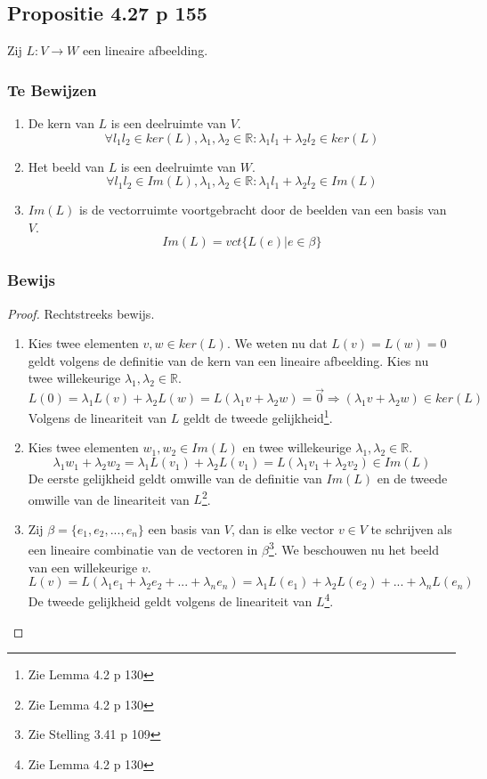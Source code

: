 \documentclass[lineaire_algebra_oplossingen.tex]{subfiles}
\begin{document}
\subsection{Propositie 4.27 p 155}
Zij $L: V\rightarrow W$ een lineaire afbeelding.
\subsubsection*{Te Bewijzen}
\begin{enumerate}
\item De kern van $L$ is een deelruimte van $V$.
\[
\forall l_1l_2\in ker(L), \lambda_1,\lambda_2\in \mathbb{R}: \lambda_1l_1+\lambda_2l_2 \in ker(L)
\]
\item Het beeld van $L$ is een deelruimte van $W$.
\[
\forall l_1l_2\in Im(L), \lambda_1,\lambda_2\in \mathbb{R}: \lambda_1l_1+\lambda_2l_2 \in Im(L)
\]
\item $Im(L)$ is de vectorruimte voortgebracht door de beelden van een basis van $V$.
\[
Im(L) = vct\{L(e)|e\in \beta\}
\]
\end{enumerate}
\subsubsection*{Bewijs}
\begin{proof}
Rechtstreeks bewijs.
\begin{enumerate}
\item Kies twee elementen $v,w \in ker(L)$. We weten nu dat $L(v)=L(w)=0$ geldt volgens de definitie van de kern van een lineaire afbeelding. Kies nu twee willekeurige $\lambda_1,\lambda_2 \in \mathbb{R}$.
\[
 L(0) = \lambda_1L(v)+\lambda_2L(w) = L(\lambda_1v+\lambda_2w) = \vec{0}
 \Rightarrow  (\lambda_1v+\lambda_2w) \in ker(L)
\]
Volgens de lineariteit van $L$ geldt de tweede gelijkheid\footnote{Zie Lemma 4.2 p 130}.
\item Kies twee elementen $w_1,w_2 \in Im(L)$ en twee willekeurige $\lambda_1,\lambda_2 \in \mathbb{R}$.
\[
\lambda_1w_1+\lambda_2w_2 = \lambda_1L(v_1) + \lambda_2L(v_1) = L(\lambda_1v_1+\lambda_2v_2) \in Im(L)
\]
De eerste gelijkheid geldt omwille van de definitie van $Im(L)$ en de tweede omwille van de lineariteit van $L$\footnote{Zie Lemma 4.2 p 130}.
\item Zij $\beta = \{e_1,e_2,...,e_n\}$ een basis van $V$, dan is elke vector $v\in V$ te schrijven als een lineaire combinatie van de vectoren in $\beta$\footnote{Zie Stelling 3.41 p 109}. We beschouwen nu het beeld van een willekeurige $v$.
\[
L(v) = L(\lambda_1e_1+\lambda_2e_2 + ... + \lambda_ne_n) = \lambda_1L(e_1)+\lambda_2L(e_2) + ... + \lambda_nL(e_n)
\] 
De tweede gelijkheid geldt volgens de lineariteit van $L$\footnote{Zie Lemma 4.2 p 130}.
\end{enumerate}
\end{proof}
\end{document}
